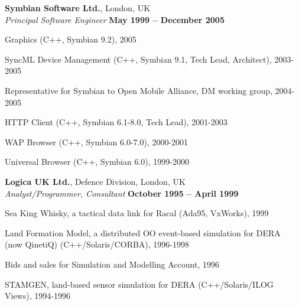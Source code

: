 \documentclass[margin = 0cm,line]{resume}
\begin{document}
\begin{resume}
    \textbf{Symbian Software Ltd.}, London, UK \vspace{2mm}\\\vspace{1mm}%
    \textsl{Principal Software Engineer} \hfill \textbf{May 1999 -- December 2005}\vspace{-3mm}\\\vspace{-1mm}%
    \begin{list2}
        \item Graphics (C++, Symbian 9.2), 2005
        \item SyncML Device Management (C++, Symbian 9.1, Tech Lead, Architect), 2003-2005
        \item Representative for Symbian to Open Mobile Alliance, DM working group, 2004-2005
        \item HTTP Client (C++, Symbian 6.1-8.0, Tech Lead), 2001-2003
        \item WAP Browser (C++, Symbian 6.0-7.0), 2000-2001
        \item Universal Browser (C++, Symbian 6.0), 1999-2000
    \end{list2}\vspace{-1.5mm}
   
    \textbf{Logica UK Ltd.}, Defence Division, London, UK \vspace{2mm}\\\vspace{1mm}%
    \textsl{Analyst/Programmer, Consultant} \hfill \textbf{October 1995 -- April 1999}\vspace{-3mm}\\\vspace{-1mm}%
    \begin{list2}
        \item Sea King Whisky, a tactical data link for Racal (Ada95, VxWorks), 1999
        \item Land Formation Model, a distributed OO event-based simulation for DERA\\(now QinetiQ) (C++/Solaris/CORBA), 1996-1998
        \item Bids and sales for Simulation and Modelling Account, 1996
        \item STAMGEN, land-based sensor simulation for DERA (C++/Solaris/ILOG Views), 1994-1996
    \end{list2}\vspace{-1.5mm}


\end{resume}
\end{document}
